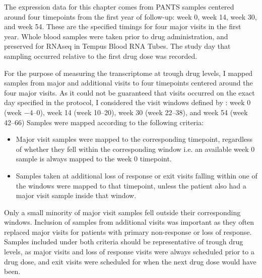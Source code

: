 \begin{outline}
%
The expression data for this chapter comes from \gls{PANTS} samples centered around four timepoints from the first year of follow-up: week 0, week 14, week 30, and week 54.
These are the specified timings for four major visits in the first year.
Whole blood samples were taken prior to drug administration, and preserved for \gls{RNAseq} in Tempus Blood RNA Tubes.
The study day that sampling occurred relative to the first drug dose was recorded.

For the purpose of measuring the transcriptome at trough drug levels, I mapped samples from major and additional visits to four timepoints centered around the four major visits.
As it could not be guaranteed that visits occurred on the exact day specified in the protocol, I considered the visit windows defined by \textcite{kennedy2019PredictorsAntiTNFTreatment}: week 0 (week \numrange{-4}{0}), week 14 (week \numrange{10}{20}), week 30 (week \numrange{22}{38}), and week 54 (week \numrange{42}{66})
Samples were mapped according to the following criteria:
\begin{itemize}
    \item Major visit samples were mapped to the corresponding timepoint, regardless of whether they fell within the corresponding window i.e. an available week 0 sample is always mapped to the week 0 timepoint.
    \item Samples taken at additional loss of response or exit visits falling within one of the windows were mapped to that timepoint, unless the patient also had a major visit sample inside that window.
\end{itemize}
Only a small minority of major visit samples fell outside their corresponding windows.
Inclusion of samples from additional visits was important as they often replaced major visits for patients with primary non-response or loss of response.
Samples included under both criteria should be representative of trough drug levels,
as major visits and loss of response visits were always scheduled prior to a drug dose,
and exit visits were scheduled for when the next drug dose would have been.


\end{outline}

